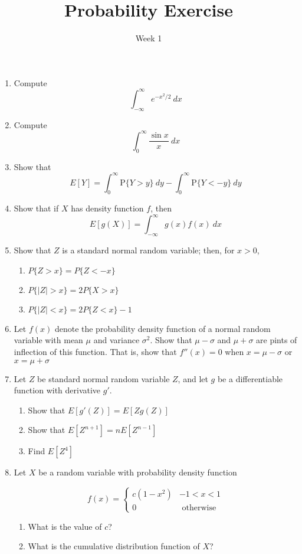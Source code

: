 


\title{Probability Exercise}

\author{Week 1}

\maketitle

\begin{enumerate}
\item Compute $$ \int_{-\infty}^{\infty} e^{-x^2/2}\ dx $$
\item Compute $$ \int_{0}^{\infty} \frac{\sin x}{x}\ dx $$
\item Show that $$E[Y] = \int_{0}^{\infty} \mathrm{P}\{Y > y\}\ dy - \int_{0}^{\infty} \mathrm{P}\{Y < -y\}\ dy$$ 
\item Show that if $X$ has density function $f$, then $$ E[g(X)] =\int_{-\infty}^{\infty} g(x)f(x)\ dx  $$
\item Show that $Z$ is a standard normal random variable; then, for $x > 0$,
	\begin{enumerate}
	\item $P\{Z > x\} = P\{Z < -x\}$
	\item $P\{|Z| > x\} = 2P\{X > x\}$
	\item $P\{|Z| < x\} = 2P\{Z < x\} - 1$
	\end{enumerate}
\item Let $f(x)$ denote the probability density function of a normal random variable with mean $\mu$ and variance $\sigma^2$. Show that $\mu - \sigma$ and $\mu + \sigma$ are pints of inflection of this function. That is, show that $f''(x) = 0$ when $x = \mu - \sigma$ or $x = \mu + \sigma$
\item Let $Z$ be standard normal random variable $Z$, and let $g$ be a differentiable function with derivative $g'$.
	\begin{enumerate}
	\item Show that $E[g'(Z)] = E[Zg(Z)]$
	\item Show that $E[Z^{n+1}] = nE[Z^{n-1}]$
	\item Find $E[Z^4]$
	\end{enumerate}
	
\newpage
	
\item Let $X$ be a random variable with probability density function

$$f(x) = \begin{cases}
	c(1 - x^2) & -1 < x < 1\\
	0 & \text{ otherwise}
\end{cases}$$
	\begin{enumerate}
	\item What is the value of $c$?
	\item What is the cumulative distribution function of $X$?
	\end{enumerate}


\end{enumerate}
